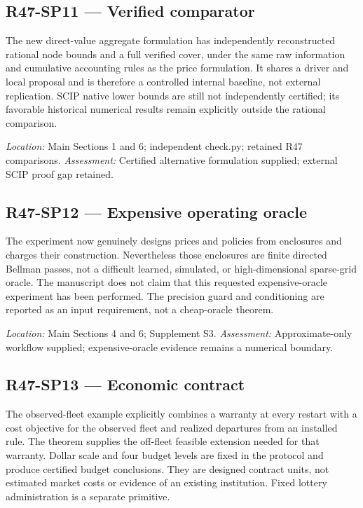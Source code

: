 \subsection{R47-SP11 --- Verified comparator}
The new direct-value aggregate formulation has independently reconstructed rational node bounds and a full verified cover, under the same raw information and cumulative accounting rules as the price formulation. It shares a driver and local proposal and is therefore a controlled internal baseline, not external replication. SCIP native lower bounds are still not independently certified; its favorable historical numerical results remain explicitly outside the rational comparison.

\noindent\emph{Location:} Main Sections 1 and 6; independent check.py; retained R47 comparisons. \emph{Assessment:} Certified alternative formulation supplied; external SCIP proof gap retained.

\subsection{R47-SP12 --- Expensive operating oracle}
The experiment now genuinely designs prices and policies from enclosures and charges their construction. Nevertheless those enclosures are finite directed Bellman passes, not a difficult learned, simulated, or high-dimensional sparse-grid oracle. The manuscript does not claim that this requested expensive-oracle experiment has been performed. The precision guard and conditioning are reported as an input requirement, not a cheap-oracle theorem.

\noindent\emph{Location:} Main Sections 4 and 6; Supplement S3. \emph{Assessment:} Approximate-only workflow supplied; expensive-oracle evidence remains a numerical boundary.

\subsection{R47-SP13 --- Economic contract}
The observed-fleet example explicitly combines a warranty at every restart with a cost objective for the observed fleet and realized departures from an installed rule. The theorem supplies the off-fleet feasible extension needed for that warranty. Dollar scale and four budget levels are fixed in the protocol and produce certified budget conclusions. They are designed contract units, not estimated market costs or evidence of an existing institution. Fixed lottery administration is a separate primitive.

